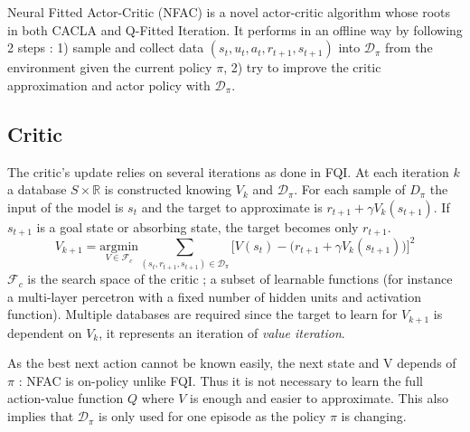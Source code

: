 Neural Fitted Actor-Critic (NFAC) is a novel actor-critic algorithm whose roots in both CACLA and Q-Fitted Iteration.
It performs in an offline way by following 2 steps : 1) sample and collect data $(s_t, u_t, a_t, r_{t+1}, s_{t+1})$ into $\mathcal{D}_\pi$
from the environment given the current policy $\pi$, 2) try to improve the critic approximation and actor policy with $\mathcal{D}_\pi$.


\subsection{Critic}

The critic's update relies on several iterations as done in FQI. 
At each iteration $k$ a database $S \times \mathbb{R}$ is constructed knowing $V_k$ and $\mathcal{D}_\pi$.
For each sample of $D_\pi$ the input of the model is $s_t$ and the target to approximate is $r_{t+1} + \gamma V_k(s_{t+1})$.
If $s_{t+1}$ is a goal state or absorbing state, the target becomes only $r_{t+1}$.
\begin{equation}
 V_{k+1} = \underset{V \in \mathcal{F}_c}{\text{argmin}} 
 \sum_{ (s_t, r_{t+1}, s_{t+1}) \in \mathcal{D}_\pi}
 \Big[ V(s_t) - \big( r_{t+1} + \gamma V_k(s_{t+1}) \big) \Big]^2
\end{equation}
$\mathcal{F}_c$ is the search space of the critic ; a subset of learnable functions
(for instance a multi-layer percetron with a fixed number of hidden units and activation function).
Multiple databases are required since the target to learn for $V_{k+1}$ is dependent on $V_k$,
it represents an iteration of {\em value iteration}.

As the best next action cannot be known easily, the next state and V depends of $\pi$ : NFAC is on-policy unlike FQI.
Thus it is not necessary to learn the full action-value function $Q$
where $V$ is enough and easier to approximate. This also implies that $\mathcal{D}_\pi$ is only
used for one episode as the policy $\pi$ is changing.

